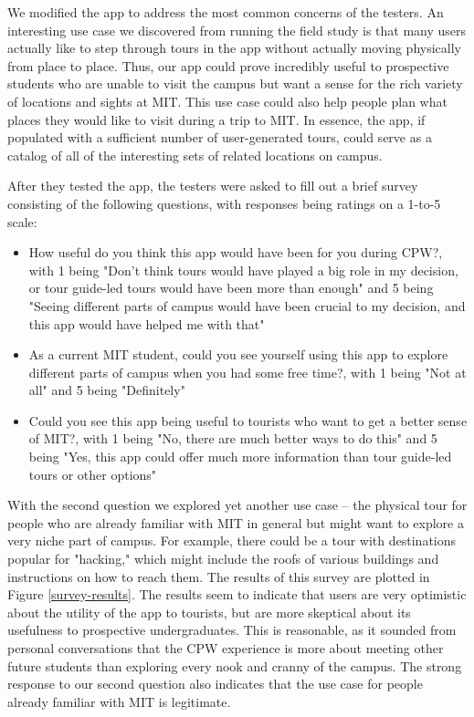 \documentclass{sigchi}
\begin{document}
We modified the app to address the most common concerns of the testers. An interesting use case we discovered from running the field study is that many users actually like to step through tours in the app without actually moving physically from place to place. Thus, our app could prove incredibly useful to prospective students who are unable to visit the campus but want a sense for the rich variety of locations and sights at MIT. This use case could also help people plan what places they would like to visit during a trip to MIT. In essence, the app, if populated with a sufficient number of user-generated tours, could serve as a catalog of all of the interesting sets of related locations on campus.

After they tested the app, the testers were asked to fill out a brief survey consisting of the following questions, with responses being ratings on a 1-to-5 scale:
\begin{itemize}
\item How useful do you think this app would have been for you during CPW?, with 1 being "Don't think tours would have played a big role in my decision, or tour guide-led tours would have been more than enough" and 5 being "Seeing different parts of campus would have been crucial to my decision, and this app would have helped me with that"
\item As a current MIT student, could you see yourself using this app to explore different parts of campus when you had some free time?, with 1 being "Not at all" and 5 being "Definitely"
\item Could you see this app being useful to tourists who want to get a better sense of MIT?, with 1 being "No, there are much better ways to do this" and 5 being "Yes, this app could offer much more information than tour guide-led tours or other options"
\end{itemize}
With the second question we explored yet another use case -- the physical tour for people who are already familiar with MIT in general but might want to explore a very niche part of campus. For example, there could be a tour with destinations popular for "hacking," which might include the roofs of various buildings and instructions on how to reach them. The results of this survey are plotted in Figure \ref{survey-results}. The results seem to indicate that users are very optimistic about the utility of the app to tourists, but are more skeptical about its usefulness to prospective undergraduates. This is reasonable, as it sounded from personal conversations that the CPW experience is more about meeting other future students than exploring every nook and cranny of the campus. The strong response to our second question also indicates that the use case for people already familiar with MIT is legitimate.
\end{document}

